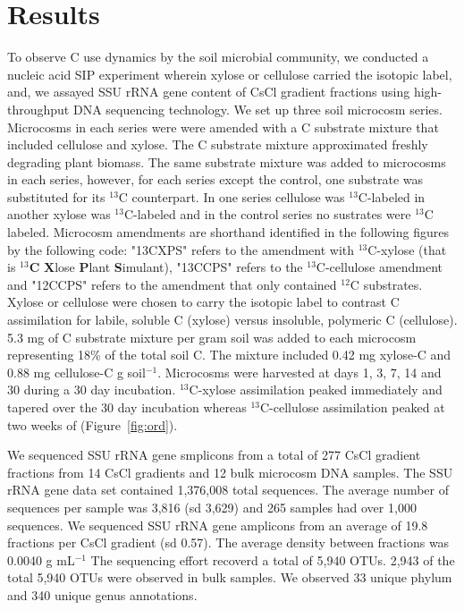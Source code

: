\section{Results}
To observe C use dynamics by the soil microbial community, we conducted a
nucleic acid SIP experiment wherein xylose or cellulose carried the isotopic
label, and, we assayed SSU rRNA gene content of CsCl gradient fractions using
high-throughput DNA sequencing technology. We set up three soil microcosm series. 
Microcosms in each series were were amended with a C substrate mixture
that included cellulose and xylose. The C substrate mixture approximated
freshly degrading plant biomass. The same substrate mixture was added to microcosms
in each series, however, for each series except the control, one substrate
was substituted for its $^{13}$C counterpart. In one series cellulose was
$^{13}$C-labeled in another xylose was $^{13}$C-labeled and in the control
series no sustrates were $^{13}$C labeled. Microcosm amendments are shorthand identified
in the following figures by the following code: "13CXPS" refers to the
amendment with $^{13}$C-xylose (that is $^{13}$\textbf{C} \textbf{X}lose
\textbf{P}lant \textbf{S}imulant), "13CCPS" refers to the $^{13}$C-cellulose
amendment and "12CCPS" refers to the amendment that only contained $^{12}$C
substrates. Xylose or cellulose were chosen to carry the isotopic label to
contrast C assimilation for labile, soluble C (xylose) versus
insoluble, polymeric C (cellulose).  5.3 mg of C substrate mixture per gram
soil was added to each microcosm representing 18\% of the total soil C. The
mixture included 0.42 mg xylose-C and 0.88 mg cellulose-C g soil$^{-1}$.
Microcosms were harvested at days 1, 3, 7, 14 and 30  during a 30 day
incubation. $^{13}$C-xylose assimilation peaked immediately and tapered
over the 30 day incubation whereas $^{13}$C-cellulose assimilation peaked at
two weeks of (Figure~\ref{fig:ord}).

We sequenced SSU rRNA gene smplicons from a total of 277 CsCl gradient fractions from 14 
CsCl gradients and 
12 bulk microcosm DNA samples. The SSU rRNA gene data set contained 1,376,008 total sequences.
The average number of sequences per sample was 3,816 (sd 3,629) and 265 samples had over 1,000
sequences. We sequenced SSU rRNA gene amplicons from an average of 19.8 fractions per CsCl
gradient (sd 0.57). The average density between fractions was  0.0040 g mL$^{-1}$ 
The sequencing effort recoverd a total of 5,940 OTUs. 2,943 of the total
5,940 OTUs were observed in bulk samples. We observed 33 unique phylum and 340 unique genus
annotations.

